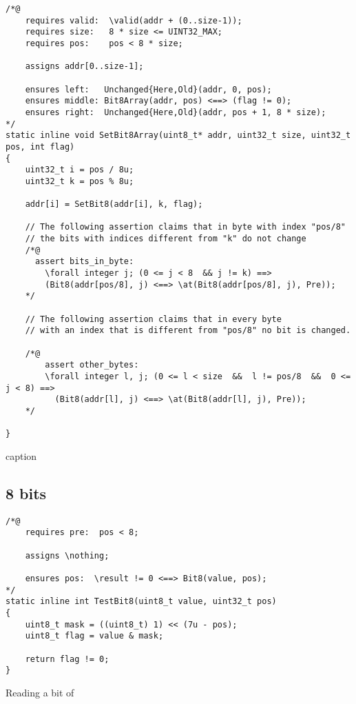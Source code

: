 \begin{listing}[hbt]
\begin{minipage}{0.99\textwidth}
\begin{lstlisting}[style=acsl-block]
/*@
    requires valid:  \valid(addr + (0..size-1));
    requires size:   8 * size <= UINT32_MAX;
    requires pos:    pos < 8 * size;

    assigns addr[0..size-1];

    ensures left:   Unchanged{Here,Old}(addr, 0, pos);
    ensures middle: Bit8Array(addr, pos) <==> (flag != 0);
    ensures right:  Unchanged{Here,Old}(addr, pos + 1, 8 * size);
*/
static inline void SetBit8Array(uint8_t* addr, uint32_t size, uint32_t pos, int flag)
{
    uint32_t i = pos / 8u;
    uint32_t k = pos % 8u;

    addr[i] = SetBit8(addr[i], k, flag);

    // The following assertion claims that in byte with index "pos/8"
    // the bits with indices different from "k" do not change
    /*@
      assert bits_in_byte:
        \forall integer j; (0 <= j < 8  && j != k) ==>
        (Bit8(addr[pos/8], j) <==> \at(Bit8(addr[pos/8], j), Pre));
    */

    // The following assertion claims that in every byte
    // with an index that is different from "pos/8" no bit is changed.

    /*@
        assert other_bytes:
        \forall integer l, j; (0 <= l < size  &&  l != pos/8  &&  0 <= j < 8) ==>
          (Bit8(addr[l], j) <==> \at(Bit8(addr[l], j), Pre));
    */

}
\end{lstlisting}
\end{minipage}
\caption{caption}
\end{listing}








\FloatBarrier

\subsection{8 bits}
\label{subsec:low-level 8}




\begin{listing}[hbt]
\begin{minipage}{0.99\textwidth}
\begin{lstlisting}[style=acsl-block]
/*@
    requires pre:  pos < 8;

    assigns \nothing;

    ensures pos:  \result != 0 <==> Bit8(value, pos);
*/
static inline int TestBit8(uint8_t value, uint32_t pos)
{
    uint8_t mask = ((uint8_t) 1) << (7u - pos);
    uint8_t flag = value & mask;

    return flag != 0;
}
\end{lstlisting}
\end{minipage}
\caption{\label{lst:TestBit8}Reading a bit of }
\end{listing}





